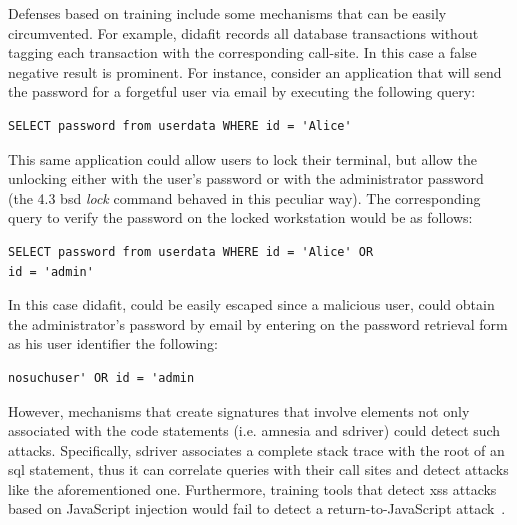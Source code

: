 \documentclass[conference]{IEEEtran}
\begin{document}
Defenses based on training include some mechanisms that can be easily
circumvented. For example, {\sc didafit} records all database
transactions without tagging each transaction with the
corresponding call-site. In this case a false negative result
is prominent. For instance, consider an application that will send the
password for a forgetful user via email by executing the following
query:
\bgroup
\lstset{language=SQL}
\begin{small}
\begin{lstlisting}
SELECT password from userdata WHERE id = 'Alice'
\end{lstlisting}
\end{small}
\egroup
\noindent
This same application could allow users to lock their terminal,
but allow the unlocking either with the user's password or with
the administrator password (the 4.3 {\sc bsd} {\em lock} command
behaved in this peculiar way).
The corresponding query to verify the password on the locked
workstation would be as follows:
\bgroup
\lstset{language=SQL}
\begin{small}
\begin{lstlisting}
SELECT password from userdata WHERE id = 'Alice' OR
id = 'admin'
\end{lstlisting}
\end{small}
\egroup
\noindent
In this case {\sc didafit}, could be easily escaped
since a malicious user, could obtain the administrator's password
by email by entering on the password retrieval form
as his user identifier the following:
\bgroup
\lstset{language=SQL}
\begin{small}
\begin{lstlisting}
nosuchuser' OR id = 'admin
\end{lstlisting}
\end{small}
\egroup
\noindent
However, mechanisms that create signatures that involve
elements not only associated with the code statements
(i.e. {\sc amnesia} and {\sc sd}river)
could detect such attacks. Specifically,
{\sc sd}river associates a complete stack trace with the
root of an {\sc sql} statement, thus it can correlate
queries with their call sites and detect attacks
like the aforementioned one.
Furthermore, training tools that detect
{\sc xss} attacks based on JavaScript injection
would fail to detect a return-to-JavaScript
attack~\cite{APKLM10}.
\end{document}
